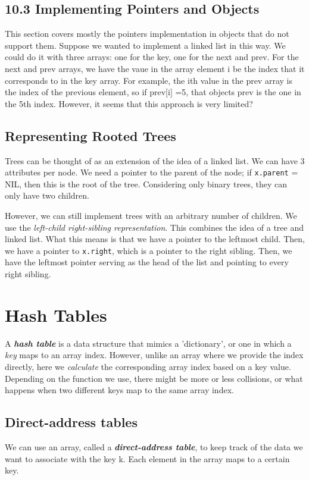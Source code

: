 \documentclass{article}
\begin{document}
\subsection{10.3 Implementing Pointers and Objects}
This section covers mostly the pointers implementation in objects that do not support them. Suppose we wanted
to implement a linked list in this way. We could do it with three arrays: one for the key, one for the next and prev. For the next and prev arrays, we have the vaue in the array element i be the index that it corresponds to 
in the key array. For example, the ith value in the prev array is the index of the previous element, so if
prev[i] =5, that objects prev is the one in the 5th index. However, it seems that this approach is very 
limited?
\subsection{Representing Rooted Trees}
Trees can be thought of as an extension of the idea of a linked list. We can have 3 attributes per node. We 
need a pointer to the parent of the node; if \texttt{x.parent} = NIL, then this is the root of the tree.
Considering only binary trees, they can only have two children.

However, we can still implement trees with an arbitrary number of children. We use the \textit{left-child
right-sibling representation}. This combines the idea of a tree and linked list. What this means is that
we have a pointer to the leftmost child. Then, we have a pointer to \texttt{x.right}, which is a pointer
to the right sibling. Then, we have the leftmost pointer serving as the head of the list and pointing
to every right sibling.
\section{Hash Tables}
A \textit{\textbf{hash table}} is a data structure that mimics a 'dictionary', or one in which a \textit{key}
maps to an array index. However, unlike an array where we provide the index directly, here we 
\textit{calculate} the corresponding array index based on a key value. Depending on the function we use,
there might be more or less collisions, or what happens when two different keys map to the same array
index.
\subsection{Direct-address tables}
We can use an array, called a \textit{\textbf{direct-address table}}, to keep track of the data we want to 
associate with the key k. Each element in the array maps to a certain key.
\end{document}
